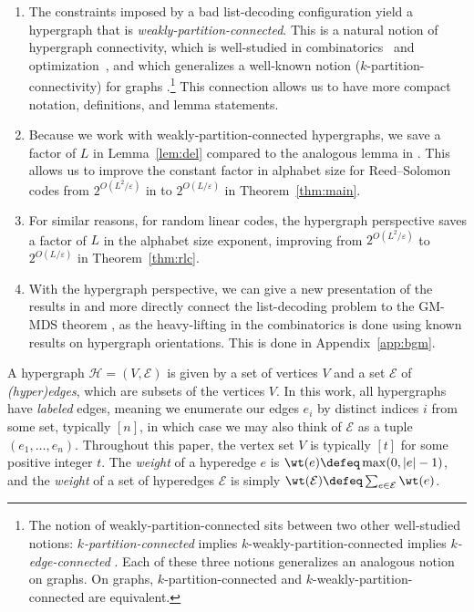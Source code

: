\documentclass{article}[11pt]
\begin{document}
\begin{enumerate}
  \item The constraints imposed by a bad list-decoding configuration yield a hypergraph that is \emph{weakly-partition-connected}. This is a natural notion of hypergraph connectivity, which is well-studied in combinatorics~\cite{FKK03, FKK03b, Kiraly03} and optimization~\cite{JMS03, FrankK09, Frank11, CX18}, and which generalizes a well-known notion ($k$-partition-connectivity) for graphs \cite{nash1961edge,tutte1961problem}.\footnote{The notion of weakly-partition-connected sits between two other well-studied notions: \emph{$k$-partition-connected} implies $k$-weakly-partition-connected implies \emph{$k$-edge-connected} \cite{Kiraly03}. Each of these three notions generalizes an analogous notion on graphs. On graphs, $k$-partition-connected and $k$-weakly-partition-connected are equivalent.} This connection allows us to have more compact notation, definitions, and lemma statements.
  \item Because we work with weakly-partition-connected hypergraphs, we save a factor of $L$ in Lemma~\ref{lem:del} compared to the analogous lemma in \cite{GZ23}. 
    This allows us to improve the constant factor in alphabet size for Reed--Solomon codes from $2^{O(L^2/\varepsilon)}$ in \cite{GZ23}  to $2^{O(L/\varepsilon)}$ in Theorem~\ref{thm:main}.
  \item For similar reasons, for random linear codes, the hypergraph perspective saves a factor of $L$ in the alphabet size exponent, improving from $2^{O(L^2/\varepsilon)}$ to $2^{O(L/\varepsilon)}$ in Theorem~\ref{thm:rlc}.
  \item With the hypergraph perspective, we can give a new presentation of the results in \cite{BGM23} and more directly connect the list-decoding problem to the GM-MDS theorem \cite{DauSY14,Lovett18,YildizH19}, as the heavy-lifting in the combinatorics is done using known results on hypergraph orientations. This is done in Appendix~\ref{app:bgm}.
\end{enumerate}


A hypergraph $\mathcal{H}=(V,\mathcal{E})$ is given by a set of vertices $V$ and a set $\mathcal{E}$ of \emph{(hyper)edges}, which are subsets of the vertices $V$.
In this work, all hypergraphs have \emph{labeled} edges, meaning we enumerate our edges $e_i$ by distinct indices $i$ from some set, typically $[n]$, in which case we may also think of $\mathcal{E}$ as a tuple $(e_1,\dots,e_n)$.
Throughout this paper, the vertex set $V$ is typically $[t]$ for some positive integer $t$.
The \emph{weight} of a hyperedge $e$ is $\wt(e)\defeq \max(0,|e|-1)$, and the \emph{weight} of a set of hyperedges $\mathcal{E}$ is simply $\wt(\mathcal{E})\defeq \sum_{e\in \mathcal{E}}{\wt(e)}$.
\end{document}
